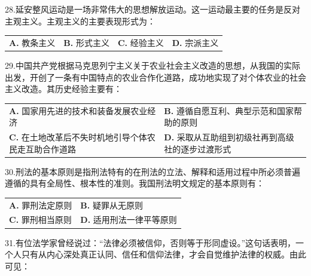 \documentclass[UTF8,11pt]{ctexart}
\begin{document}
28.延安整风运动是一场非常伟大的思想解放运动。这一运动最主要的任务是反对主观主义。主观主义的主要表现形式为：


\begin{center}\begin{tabular}{>{\raggedright\arraybackslash}p{\dimexpr(\linewidth-8\tabcolsep)/4\relax}>{\raggedright\arraybackslash}p{\dimexpr(\linewidth-8\tabcolsep)/4\relax}>{\raggedright\arraybackslash}p{\dimexpr(\linewidth-8\tabcolsep)/4\relax}>{\raggedright\arraybackslash}p{\dimexpr(\linewidth-8\tabcolsep)/4\relax}}
\textbf{A.} 教条主义 & \textbf{B.} 形式主义 & \textbf{C.} 经验主义 & \textbf{D.} 宗派主义\\[.35em]\end{tabular}\end{center}

29.中国共产党根据马克思列宁主义关于农业社会主义改造的思想，从我国的实际出发，开创了一条有中国特点的农业合作化道路，成功地实现了对个体农业的社会主义改造。其历史经验主要有：


\begin{center}\begin{tabular}{>{\raggedright\arraybackslash}p{\dimexpr(\linewidth-4\tabcolsep)/2\relax}>{\raggedright\arraybackslash}p{\dimexpr(\linewidth-4\tabcolsep)/2\relax}}
\textbf{A.} 国家用先进的技术和装备发展农业经济 & \textbf{B.} 遵循自愿互利、典型示范和国家帮助的原则\\[.35em]
\textbf{C.} 在土地改革后不失时机地引导个体农民走互助合作道路 & \textbf{D.} 采取从互助组到初级社再到高级社的逐步过渡形式\\[.35em]\end{tabular}\end{center}

30.刑法的基本原则是指刑法特有的在刑法的立法、解释和适用过程中所必须普遍遵循的具有全局性、根本性的准则。我国刑法明文规定的基本原则有：


\begin{center}\begin{tabular}{>{\raggedright\arraybackslash}p{\dimexpr(\linewidth-4\tabcolsep)/2\relax}>{\raggedright\arraybackslash}p{\dimexpr(\linewidth-4\tabcolsep)/2\relax}}
\textbf{A.} 罪刑法定原则 & \textbf{B.} 疑罪从无原则\\[.35em]
\textbf{C.} 罪刑相当原则 & \textbf{D.} 适用刑法一律平等原则\\[.35em]\end{tabular}\end{center}

31.有位法学家曾经说过：“法律必须被信仰，否则等于形同虚设。”这句话表明，一个人只有从内心深处真正认同、信任和信仰法律，才会自觉维护法律的权威。由此可见：
\end{document}
